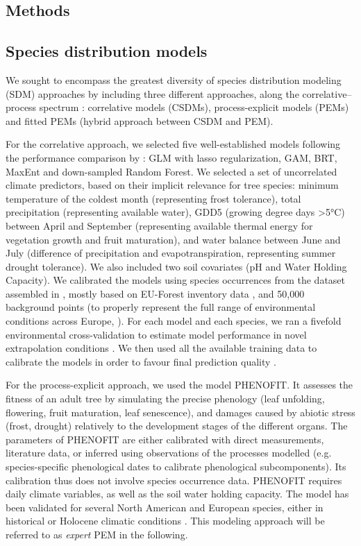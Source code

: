 \documentclass[letterpaper,8pt]{extarticle}  %
\begin{document}
\begin{doublespacing}
\begin{linenumbers}
\section{Methods}

\subsection{Species distribution models}

We sought to encompass the greatest diversity of species distribution modeling (SDM) approaches by including three different approaches, along the correlative–process spectrum \citep{Dormann2012}: correlative models (CSDMs), process-explicit models (PEMs) and fitted PEMs (hybrid approach between CSDM and PEM).

For the correlative approach, we selected five well-established models following the performance comparison by \cite{Valavi2022}: GLM with lasso regularization, GAM, BRT, MaxEnt and down-sampled Random Forest. We selected a set of uncorrelated climate predictors, based on their implicit relevance for tree species: minimum temperature of the coldest month (representing frost tolerance), total precipitation (representing available water), GDD5 (growing degree days \textgreater5°C) between April and September (representing available thermal energy for vegetation growth and fruit maturation), and water balance between June and July (difference of precipitation and evapotranspiration, representing summer drought tolerance). We also included two soil covariates (pH and Water Holding Capacity). We calibrated the models using species occurrences from the dataset assembled in \cite{VanderMeersch2023}, mostly based on EU-Forest inventory data \citep{Mauri2017}, and 50,000 background points (to properly represent the full range of environmental conditions across Europe, \citealp{Valavi2022}). For each model and each species, we ran a fivefold environmental cross-validation to estimate model performance in novel extrapolation conditions \citep{Roberts2017}. We then used all the available training data to calibrate the models in order to favour final prediction quality \citep{Roberts2017}.

For the process-explicit approach, we used the model PHENOFIT. It assesses the fitness of an adult tree by simulating the precise phenology (leaf unfolding, flowering, fruit maturation, leaf senescence), and damages caused by abiotic stress (frost, drought) relatively to the development stages of the different organs. The parameters of PHENOFIT are either calibrated with direct measurements, literature data, or inferred  using observations of the processes modelled (e.g. species-specific phenological dates to calibrate phenological subcomponents). Its calibration thus does not involve species occurrence data. PHENOFIT requires daily climate variables, as well as the soil water holding capacity. The model has been validated for several North American and European species, either in historical or Holocene climatic conditions \citep{Morin2007, Saltre2013, Duputie2015, Gauzere2020, VanderMeersch2024}. This modeling approach will be referred to as \emph{expert} PEM in the following.


\end{linenumbers}
\end{doublespacing}
\end{document}
